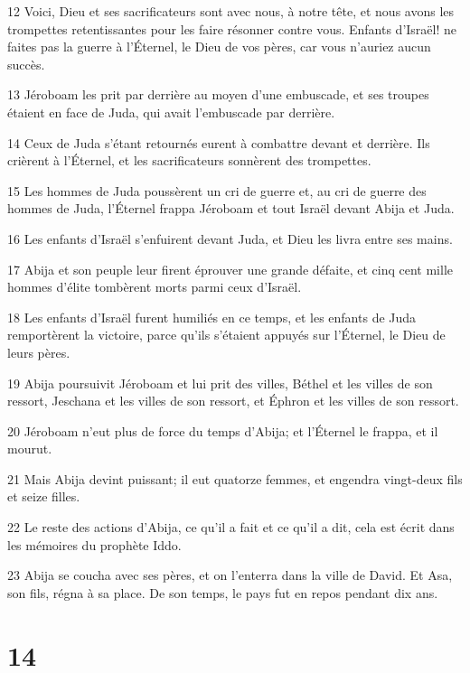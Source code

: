 \par 12 Voici, Dieu et ses sacrificateurs sont avec nous, à notre tête, et nous avons les trompettes retentissantes pour les faire résonner contre vous. Enfants d'Israël! ne faites pas la guerre à l'Éternel, le Dieu de vos pères, car vous n'auriez aucun succès.
\par 13 Jéroboam les prit par derrière au moyen d'une embuscade, et ses troupes étaient en face de Juda, qui avait l'embuscade par derrière.
\par 14 Ceux de Juda s'étant retournés eurent à combattre devant et derrière. Ils crièrent à l'Éternel, et les sacrificateurs sonnèrent des trompettes.
\par 15 Les hommes de Juda poussèrent un cri de guerre et, au cri de guerre des hommes de Juda, l'Éternel frappa Jéroboam et tout Israël devant Abija et Juda.
\par 16 Les enfants d'Israël s'enfuirent devant Juda, et Dieu les livra entre ses mains.
\par 17 Abija et son peuple leur firent éprouver une grande défaite, et cinq cent mille hommes d'élite tombèrent morts parmi ceux d'Israël.
\par 18 Les enfants d'Israël furent humiliés en ce temps, et les enfants de Juda remportèrent la victoire, parce qu'ils s'étaient appuyés sur l'Éternel, le Dieu de leurs pères.
\par 19 Abija poursuivit Jéroboam et lui prit des villes, Béthel et les villes de son ressort, Jeschana et les villes de son ressort, et Éphron et les villes de son ressort.
\par 20 Jéroboam n'eut plus de force du temps d'Abija; et l'Éternel le frappa, et il mourut.
\par 21 Mais Abija devint puissant; il eut quatorze femmes, et engendra vingt-deux fils et seize filles.
\par 22 Le reste des actions d'Abija, ce qu'il a fait et ce qu'il a dit, cela est écrit dans les mémoires du prophète Iddo.
\par 23 Abija se coucha avec ses pères, et on l'enterra dans la ville de David. Et Asa, son fils, régna à sa place. De son temps, le pays fut en repos pendant dix ans.

\chapter{14}

